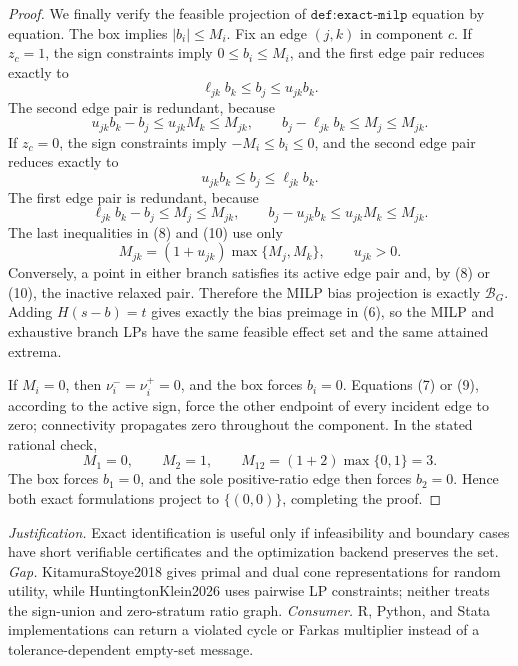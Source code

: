 \documentclass{article}
\begin{document}
\begin{proof}
We finally verify the feasible projection of \(\texttt{def:exact-milp}\) equation by equation.  The box implies \(|b_i|\le M_i\).  Fix an edge \((j,k)\) in component \(c\).  If \(z_c=1\), the sign constraints imply \(0\le b_i\le M_i\), and the first edge pair reduces exactly to
\[
 \ell_{jk}b_k\le b_j\le u_{jk}b_k.
\tag{7}
\]
The second edge pair is redundant, because
\[
 u_{jk}b_k-b_j\le u_{jk}M_k\le M_{jk},
 \qquad
 b_j-\ell_{jk}b_k\le M_j\le M_{jk}.
\tag{8}
\]
If \(z_c=0\), the sign constraints imply \(-M_i\le b_i\le0\), and the second edge pair reduces exactly to
\[
 u_{jk}b_k\le b_j\le\ell_{jk}b_k.
\tag{9}
\]
The first edge pair is redundant, because
\[
 \ell_{jk}b_k-b_j\le M_j\le M_{jk},
 \qquad
 b_j-u_{jk}b_k\le u_{jk}M_k\le M_{jk}.
\tag{10}
\]
The last inequalities in (8) and (10) use only
\[
 M_{jk}=(1+u_{jk})\max\{M_j,M_k\},
 \qquad u_{jk}>0.
\]
Conversely, a point in either branch satisfies its active edge pair and, by (8) or (10), the inactive relaxed pair.  Therefore the MILP bias projection is exactly \(\mathcal B_G\).  Adding \(H(s-b)=t\) gives exactly the bias preimage in (6), so the MILP and exhaustive branch LPs have the same feasible effect set and the same attained extrema.

If \(M_i=0\), then \(\nu_i^- =\nu_i^+=0\), and the box forces \(b_i=0\).  Equations (7) or (9), according to the active sign, force the other endpoint of every incident edge to zero; connectivity propagates zero throughout the component.  In the stated rational check,
\[
 M_1=0,
 \qquad M_2=1,
 \qquad M_{12}=(1+2)\max\{0,1\}=3.
\]
The box forces \(b_1=0\), and the sole positive-ratio edge then forces \(b_2=0\).  Hence both exact formulations project to \(\{(0,0)\}\), completing the proof.
\end{proof}
\par\smallskip\noindent \textit{Justification.} Exact identification is useful only if infeasibility and boundary cases have short verifiable certificates and the optimization backend preserves the set. \textit{Gap.} KitamuraStoye2018 gives primal and dual cone representations for random utility, while HuntingtonKlein2026 uses pairwise LP constraints; neither treats the sign-union and zero-stratum ratio graph. \textit{Consumer.} R, Python, and Stata implementations can return a violated cycle or Farkas multiplier instead of a tolerance-dependent empty-set message.
\end{document}

